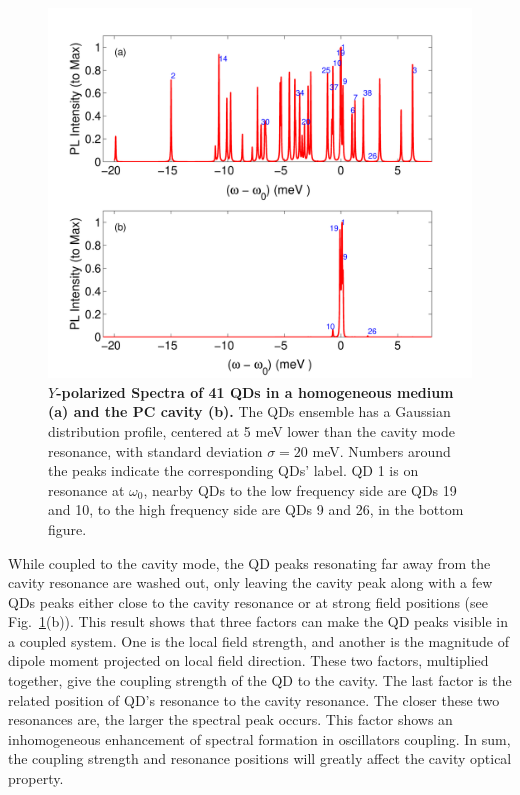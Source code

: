 \begin{figure}[htp]%
\centering
\begin{center}
\includegraphics[width=12cm]{./Figs/QDspecPChom}
\end{center}
\caption[Spectra of 41 QDs in a homogeneous medium and a PC cavity.]{\textbf{$Y$-polarized Spectra of 41 QDs in a homogeneous medium (a) and the PC cavity (b).} The QDs ensemble has a Gaussian distribution profile, centered at 5 meV lower than the cavity mode resonance, with standard deviation $\sigma=20$ meV. Numbers around the peaks indicate the corresponding QDs' label. QD 1 is on resonance at $\omega_0$, nearby QDs to the low frequency side are QDs 19 and 10, to the high frequency side are QDs 9 and 26, in the bottom figure.}
\label{QDspecPChom}
\end{figure}

While coupled to the cavity mode, the QD peaks resonating far away from the cavity resonance are washed out, only leaving the cavity peak along with a few QDs peaks either close to the cavity resonance or at strong field positions (see Fig.~\ref{QDspecPChom}(b)).
This result shows that three factors can make the QD peaks visible in a coupled system.
One is the local field strength, and another is the magnitude of dipole moment projected on local field direction.
These two factors, multiplied together, give the coupling strength of the QD to the cavity.
The last factor is the related position of QD's resonance to the cavity resonance.
The closer these two resonances are, the larger the spectral peak occurs.
This factor shows an inhomogeneous enhancement of spectral formation in oscillators coupling.
In sum, the coupling strength and resonance positions will greatly affect the cavity optical property.

